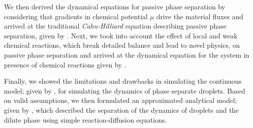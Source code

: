 We then derived the dynamical equations for passive phase separation by considering that gradients in chemical potential $\mu$ drive the material fluxes and arrived at the traditional \textit{Cahn-Hilliard} equation describing passive phase separation, given by . 
Next, we took into account the effect of local and weak chemical reactions, which break detailed balance and lead to novel physics, on passive phase separation and arrived at the dynamical equation for the system in presence of chemical reactions given by .

Finally, we showed the limitations and drawbacks in simulating the continuous model; given by , for simulating the dynamics of phase separate droplets.
Based on valid assumptions, we then formulated an approximated analytical model; given by , which described the separation of the dynamics of droplets and the dilute phase using simple reaction-diffusion equations.